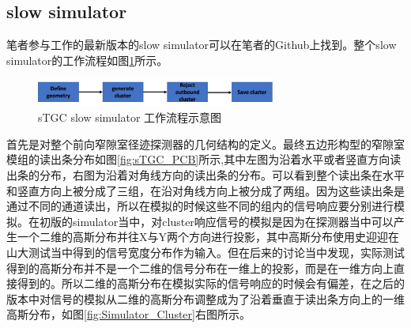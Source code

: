 \subsection{slow simulator}

笔者参与工作的最新版本的slow simulator可以在笔者的Github上找到。整个slow simulator的工作流程如图\ref{fig:Simulator_flow}所示。
\begin{figure}[htb]
    \begin{center}
    \includegraphics[width=0.7\textwidth,clip]{figures/Chapter3/Simulator_flow.png}
    \end{center}
    \caption[sTGC slow simulator 工作流程示意图]{sTGC slow simulator 工作流程示意图}
    \label{fig:Simulator_flow}
\end{figure}

首先是对整个前向窄隙室径迹探测器的几何结构的定义。最终五边形构型的窄隙室模组的读出条分布如图\ref{fig:sTGC_PCB}所示,其中左图为沿着水平或者竖直方向读出条的分布，右图为沿着对角线方向的读出条的分布。可以看到整个读出条在水平和竖直方向上被分成了三组，在沿对角线方向上被分成了两组。因为这些读出条是通过不同的通道读出，所以在模拟的时候这些不同的组内的信号响应要分别进行模拟。在初版的simulator当中，对cluster响应信号的模拟是因为在探测器当中可以产生一个二维的高斯分布并往X与Y两个方向进行投影，其中高斯分布使用史迎迎在山大测试当中得到的信号宽度分布作为输入。但在后来的讨论当中发现，实际测试得到的高斯分布并不是一个二维的信号分布在一维上的投影，而是在一维方向上直接得到的。所以二维的高斯分布在模拟实际的信号响应的时候会有偏差，在之后的版本中对信号的模拟从二维的高斯分布调整成为了沿着垂直于读出条方向上的一维高斯分布，如图\ref{fig:Simulator_Cluster}右图所示。

